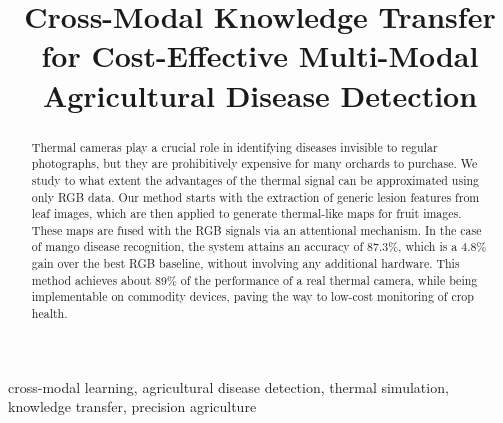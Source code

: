\documentclass[conference]{IEEEtran}
\begin{document}
\title{Cross-Modal Knowledge Transfer for Cost-Effective Multi-Modal Agricultural Disease Detection}

\author{
    \and
    \and
}

\maketitle

\begin{abstract}
Thermal cameras play a crucial role in identifying diseases invisible to regular photographs, but they are prohibitively expensive for many orchards to purchase. We study to what extent the advantages of the thermal signal can be approximated using only RGB data. Our method starts with the extraction of generic lesion features from leaf images, which are then applied to generate thermal-like maps for fruit images. These maps are fused with the RGB signals via an attentional mechanism. In the case of mango disease recognition, the system attains an accuracy of 87.3\%, which is a 4.8\% gain over the best RGB baseline, without involving any additional hardware. This method achieves about 89\% of the performance of a real thermal camera, while being implementable on commodity devices, paving the way to low-cost monitoring of crop health. 
\end{abstract}

\begin{IEEEkeywords}
cross-modal learning, agricultural disease detection, thermal simulation, knowledge transfer, precision agriculture
\end{IEEEkeywords}
\end{document}
